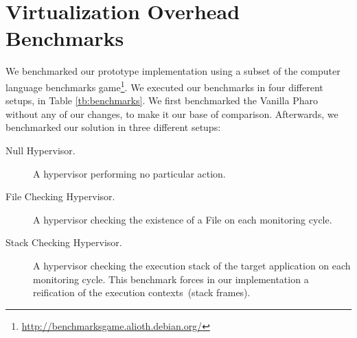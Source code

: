 \section{Virtualization Overhead Benchmarks} \label{sec:virtualization_benchmarks}

We benchmarked our prototype implementation using a subset of the computer language benchmarks game\footnote{\url{http://benchmarksgame.alioth.debian.org/}}. We executed our benchmarks in four different setups, in Table \ref{tb:benchmarks}. We first benchmarked the Vanilla Pharo \VM without any of our changes, to make it our base of comparison. Afterwards, we benchmarked our solution in three different setups:

\begin{description}
\item[Null Hypervisor.] A hypervisor performing no particular action.
\item[File Checking Hypervisor.] A hypervisor checking the existence of a File on each monitoring cycle.
\item[Stack Checking Hypervisor.] A hypervisor checking the execution stack of the target application on each monitoring cycle. This benchmark forces in our implementation a reification of the execution contexts~(stack frames).
\end{description}

